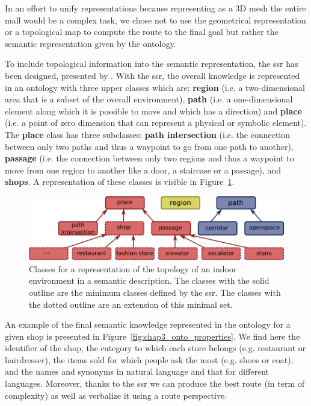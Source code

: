 \documentclass[a4paper,11pt,twoside]{StyleThese}
\begin{document}
In an effort to unify representations because representing as a 3D mesh the entire mall would be a complex task, we chose not to use the geometrical representation or a topological map to compute the route to the final goal but rather the semantic representation given by the ontology.

To include topological information into the semantic representation, the \acrfull{ssr} has been designed, presented by \cite{sarthou_2019_semantic}. With the \acrshort{ssr}, the overall knowledge is represented in an ontology with three upper classes which are: \textbf{region} (i.e. a two-dimensional area that is a subset of the overall environment), \textbf{path} (i.e. a one-dimensional element along which it is possible to move and which has a direction) and \textbf{place} (i.e. a point of zero dimension that can represent a physical or symbolic element). The \textbf{place} class has three subclasses: \textbf{path intersection} (i.e. the connection between only two paths and thus a waypoint to go from one path to another), \textbf{passage} (i.e. the connection between only two regions and thus a waypoint to move from one region to another like a door, a staircase or a passage), and \textbf{shops}. A representation of these classes is visible in Figure~\ref{fig:chap3_onto_classes}.

\begin{figure}[!ht]
	\centering
	\includegraphics[scale=0.45]{figures/chapter3/classes.png}
	\caption{\label{fig:chap3_onto_classes} Classes for a representation of the topology of an indoor environment in a semantic description. The classes with the solid outline are the minimum classes defined by the \acrshort{ssr}. The classes with the dotted outline are an extension of this minimal set.}
\end{figure}

An example of the final semantic knowledge represented in the ontology for a given shop is presented in Figure~\ref{fig:chap3_onto_properties}. We find here the identifier of the shop, the category to which each store belongs (e.g. restaurant or hairdresser), the items sold for which people ask the most (e.g. shoes or coat), and the names and synonyms in natural language and that for different languages.
Moreover, thanks to the \acrshort{ssr} we can produce the best route (in term of complexity) as well as verbalize it using a route perspective.
\end{document}

